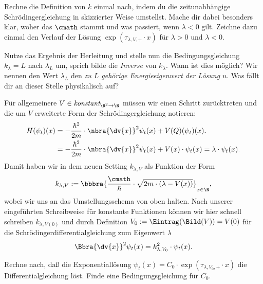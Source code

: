 \documentclass{subfiles}
\begin{document}
        \begin{Aufgabe}
            \nr{} Rechne die Definition von $k$ einmal nach, indem du die zeitunabhängige Schrödingergleichung in skizzierter Weise umstellst. Mache dir dabei besonders klar, woher das $\cmath$ stammt und was passiert, wenn $\lambda < 0$ gilt. Zeichne dazu einmal den Verlauf der Lösung $\exp(\tau_{\lambda,V,+}\cdot x)$ für $\lambda > 0$ und $\lambda < 0$.


            \nr{} Nutze das Ergebnis der Herleitung und stelle nun die Bedingungsgleichung $k_\lambda = L$ nach $\lambda_L$ um, sprich bilde die \emph{Inverse} von $k_\lambda$. Wann ist dies möglich? Wir nennen den Wert $\lambda_L$ den \emph{zu $L$ gehörige Energieeigenwert der Lösung $u$}. Was fällt dir an dieser Stelle physikalisch auf? 
        \end{Aufgabe}
        Für allgemeinere $V\in\textit{konstant}_{\R^2\to\R}$ müssen wir einen Schritt zurücktreten und die um $V$ erweiterte Form der Schrödingergleichung notieren: 
        \begin{align*}
            H(\psi_t)(x) &= -\frac{\hbar^2}{2m}\cdot\nbra{\dv{x}}^2\psi_t(x) + V(Q)(\psi_t)(x). \\
            &= -\frac{\hbar^2}{2m}\cdot\nbra{\dv{x}}^2\psi_t(x) + V(x)\cdot\psi_t(x) = \lambda\cdot\psi_t(x).
        \end{align*}
        Damit haben wir in dem neuen Setting $k_{\lambda,V}$ als Funktion der Form 
        \[
            k_{\lambda,V}:=\bbbra{\frac{\cmath}{\hbar}\cdot\sqrt{2m\cdot(\lambda - V(x))}}_{x\in\R},
        \]
        wobei wir uns an das Umstellungsschema von oben halten. Nach unserer eingeführten Schreibweise für konstante Funktionen können wir hier schnell schreiben $k_{\lambda,V(0)}$ und durch Definition $V_0:=\Eintrag(\Bild(V)) = V(0)$ für die Schrödingerdifferentialgleichung zum Eigenwert $\lambda$
        \[
            \Bbra{\dv{x}}^2\psi_t(x) = k_{\lambda,V_0}^2\cdot\psi_t(x).
        \]
        \begin{Aufgabe}
            \nr{} Rechne nach, daß die Exponentiallösung $\psi_t(x) = C_0\cdot{\exp}(\tau_{\lambda,V_0,+}\cdot x)$ die Differentialgleichung löst. Finde eine Bedingungsgleichung für $C_0$. 
        \end{Aufgabe}
        
\end{document}
